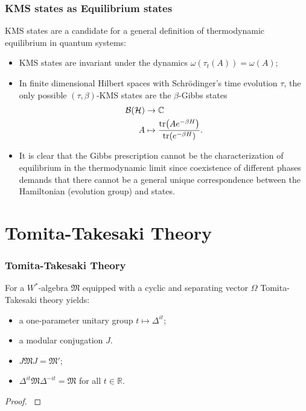 \documentclass{beamer}
\begin{document}
\begin{frame}
	\frametitle{KMS states as Equilibrium states}	
	KMS states are a candidate for a general definition of thermodynamic equilibrium in quantum systems\cite{Haag1967}:
	\begin{itemize}
		\item KMS states are invariant under the dynamics $\omega(\tau_t(A))=\omega(A)$;
		\item In finite dimensional Hilbert spaces with Schrödinger's time evolution $\tau$, the only possible $(\tau,\beta)$-KMS states are the $\beta$-Gibbs states
		\begin{align*}
			\mathcal{B}(\mathcal{H})&\rightarrow\mathbb{C} \\
			A&\mapsto \frac{\tr(Ae^{-\beta H})}{\tr(e^{-\beta H})}.
		\end{align*}
		\item It is clear that the Gibbs prescription cannot be the characterization of equilibrium in the thermodynamic limit since coexistence of different phases demands that there cannot be a general unique correspondence between the Hamiltonian (evolution group) and states\cite{Connes1994}.
	\end{itemize}
\end{frame}

\section{Tomita-Takesaki Theory}

\begin{frame}
	\frametitle{Tomita-Takesaki Theory}
	For a $W^*$-algebra $\mathfrak{M}$ equipped with a cyclic and separating vector $\Omega$ Tomita-Takesaki theory yields:
	\begin{itemize}
		\item a one-parameter unitary group $t\mapsto\Delta^{it}$;
		\item a modular conjugation $J$.
	\end{itemize}
	\begin{theorem}
		\begin{itemize}
			\item $J\mathfrak{M}J=\mathfrak{M}'$;
			\item $\Delta^{it}\mathfrak{M}\Delta^{-it}=\mathfrak{M}$ for all $t\in\mathbb{R}$. 	
		\end{itemize}
	\end{theorem}
	\begin{proof}
		\cite{Bratteli1987}
	\end{proof}
\end{frame}
\end{document}
